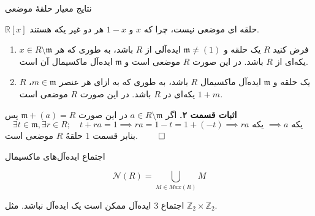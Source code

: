 \begin{frame}[t]{نتایج معیار حلقهٔ موضعی}
    \begin{corollary}
        \(\mathbb{R}[x]\)
        حلقه ای موضعی نیست،‌ چرا که
        \(x\)
        و
        \(1-x\)
        هر دو غیر یکه هستند.
    \end{corollary}

    \begin{corollary}
        \begin{enumerate}
            \item فرض کنید
                  \(R\)
                  یک حلقه و
                  \(\mathfrak{m}  \neq (1)\)
                  ایده‌آلی از
                  \(R\)
                  باشد، به طوری که هر
                  \(x \in R \setminus \mathfrak{m}\)
                  یکه‌ای از
                  \(R\)
                  باشد. در این صورت
                  \(R\)
                  موضعی است و
                  \(\mathfrak{m}\)
                  ایده‌آل ماکسیمال آن است.
                  \label{part1}
            \item \(R\)
                  یک حلقه و
                  \(\mathfrak{m}\)
                  ایده‌آل ماکسیمال
                  \(R\)
                  باشد، به طوری که به ازای هر عنصر
                  \(m \in \mathfrak{m}\)،
                  \(1+m\)
                  یکه‌ای در
                  \(R\)
                  باشد. در این صورت
                  \(R\)
                  موضعی است.
                  \label{part2}
        \end{enumerate}
    \end{corollary}


    \textbf{اثبات قسمت ۲.}
    اگر
    \(a \in R \setminus \mathfrak{m}\)
    در این صورت
    \(\mathfrak{m} + (a) = R\)
    پس
    \[
        \exists t \in \mathfrak{m}, \exists r \in R; \quad t + ra = 1 \implies ra = 1 - t = 1 + (-t) \implies ra \text{ یکه } \implies a \text{ یکه }
    \]
    بنابر
    قسمت
    1
    حلقهُ
    \(R\)
    موضعی است.
    \hfill \(\qed\)
\end{frame}

\begin{frame}[t]{اجتماع ایده‌آل‌های ماکسیمال}
    \begin{definition}
        \[
            \mathcal{N}(R) = \bigcup_{M \in Max(R)} M
        \]
    \end{definition}


    \begin{remark}
        اجتماع 3 ایده‌آل ممکن است یک ایده‌آل نباشد. مثل \( \mathbb{Z}_2 \times \mathbb{Z}_2 \).
    \end{remark}

\end{frame}

